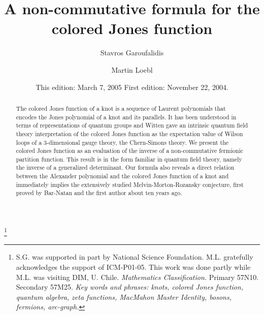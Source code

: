 \documentclass{amsart}
\theoremstyle{plain}
\theoremstyle{definition}
\theoremstyle{remark}
\begin{document}

\title[A non-commutative formula for the colored Jones function]
{A non-commutative formula for the colored Jones function}
\author{Stavros Garoufalidis}
\address{School of Mathematics \\
         Georgia Institute of Technology \\
         Atlanta, GA 30332-0160, USA}
\author{Martin Loebl}
\address{KAM MFF UK \\
Institute of Theoretical Computer Science (ITI)\\
Charles University \\
Malostranske n. 25 \\
118 00 Praha 1 \\
Czech Republic.}

\thanks{S.G. was supported in part by National Science Foundation. 
M.L. gratefully acknowledges the support of ICM-P01-05. This work was done 
partly while M.L. was visiting DIM, U. Chile.
        {\em Mathematics Classification.} Primary 57N10. Secondary 57M25.
\newline
{\em Key words and phrases: knots, colored Jones function, quantum algebra, 
zeta functions, MacMahon Master Identity, bosons, fermions, arc-graph.} 
}

\date{
This edition: March 7, 2005 \hspace{0.5cm} First edition: November 22, 2004.}


\begin{abstract}
The colored Jones function of a knot is a sequence of Laurent polynomials
that encodes the Jones polynomial of a knot and its parallels. It has been 
understood 
in terms of representations of quantum groups and Witten gave an intrinsic 
quantum field theory interpretation of the colored Jones function as 
the expectation 
value of Wilson loops of a 3-dimensional gauge theory, the Chern-Simons 
theory. 
We present the colored Jones function as an evaluation of the inverse of a 
non-commutative 
fermionic partition function. This result is in the form familiar in 
quantum field theory, namely the inverse of a generalized determinant.
 Our formula also reveals a direct relation between the Alexander
polynomial and the colored Jones function of a knot and immediately implies
 the extensively studied Melvin-Morton-Rozansky conjecture,
first proved by Bar-Natan and the first author about ten years ago.
\end{abstract}
\end{document}
